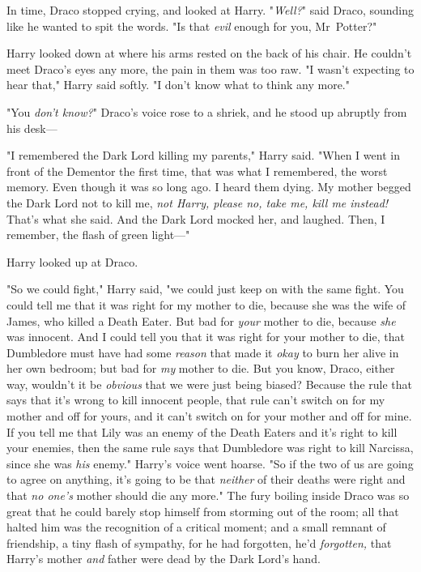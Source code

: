 In time, Draco stopped crying, and looked at Harry. "\emph{Well?}" said Draco,
sounding like he wanted to spit the words. "Is that \emph{evil} enough for you,
Mr~Potter?"

Harry looked down at where his arms rested on the back of his chair. He
couldn’t meet Draco’s eyes any more, the pain in them was too raw. "I wasn’t
expecting to hear that," Harry said softly. "I don’t know what to think any
more."

"You \emph{don’t know?}" Draco’s voice rose to a shriek, and he stood up
abruptly from his desk—

"I remembered the Dark Lord killing my parents," Harry said. "When I went in
front of the Dementor the first time, that was what I remembered, the worst
memory. Even though it was so long ago. I heard them dying. My mother begged
the Dark Lord not to kill me, \emph{not Harry, please no, take me, kill me
instead!} That’s what she said. And the Dark Lord mocked her, and laughed.
Then, I remember, the flash of green light—"

Harry looked up at Draco.

"So we could fight," Harry said, "we could just keep on with the same fight.
You could tell me that it was right for my mother to die, because she was the
wife of James, who killed a Death Eater. But bad for \emph{your} mother to die,
because \emph{she} was innocent. And I could tell you that it was right for
your mother to die, that Dumbledore must have had some \emph{reason} that made
it \emph{okay} to burn her alive in her own bedroom; but bad for \emph{my}
mother to die. But you know, Draco, either way, wouldn’t it be \emph{obvious}
that we were just being biased? Because the rule that says that it’s wrong to
kill innocent people, that rule can’t switch on for my mother and off for
yours, and it can’t switch on for your mother and off for mine. If you tell me
that Lily was an enemy of the Death Eaters and it’s right to kill your enemies,
then the same rule says that Dumbledore was right to kill Narcissa, since she
was \emph{his} enemy." Harry’s voice went hoarse. "So if the two of us are
going to agree on anything, it’s going to be that \emph{neither} of their
deaths were right and that \emph{no one’s} mother should die any more."
\later
The fury boiling inside Draco was so great that he could barely stop himself
from storming out of the room; all that halted him was the recognition of a
critical moment; and a small remnant of friendship, a tiny flash of sympathy,
for he had forgotten, he’d \emph{forgotten,} that Harry’s mother \emph{and}
father were dead by the Dark Lord’s hand.

